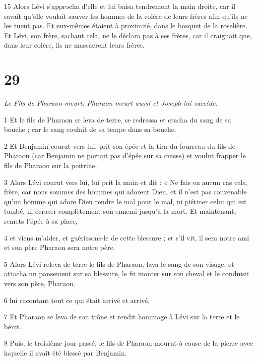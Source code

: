 \par 15 Alors Lévi s'approcha d'elle et lui baisa tendrement la main droite, car il savait qu'elle voulait sauver les hommes de la colère de leurs frères afin qu'ils ne les tuent pas. Et eux-mêmes étaient à proximité, dans le bosquet de la roselière. Et Lévi, son frère, sachant cela, ne le déclara pas à ses frères, car il craignait que, dans leur colère, ils ne massacrent leurs frères.

\chapter{29}

\par \textit{Le Fils de Pharaon meurt. Pharaon meurt aussi et Joseph lui succède.}

\par 1 Et le fils de Pharaon se leva de terre, se redressa et cracha du sang de sa bouche ; car le sang coulait de sa tempe dans sa bouche.

\par 2 Et Benjamin courut vers lui, prit son épée et la tira du fourreau du fils de Pharaon (car Benjamin ne portait pas d'épée sur sa cuisse) et voulut frapper le fils de Pharaon sur la poitrine.

\par 3 Alors Lévi courut vers lui, lui prit la main et dit : « Ne fais en aucun cas cela, frère, car nous sommes des hommes qui adorent Dieu, et il n'est pas convenable qu'un homme qui adore Dieu rendre le mal pour le mal, ni piétiner celui qui est tombé, ni écraser complètement son ennemi jusqu'à la mort. Et maintenant, remets l'épée à sa place,

\par 4 et viens m'aider, et guérissons-le de cette blessure ; et s'il vit, il sera notre ami et son père Pharaon sera notre père.

\par 5 Alors Lévi releva de terre le fils de Pharaon, lava le sang de son visage, et attacha un pansement sur sa blessure, le fit monter sur son cheval et le conduisit vers son père, Pharaon.

\par 6 lui racontant tout ce qui était arrivé et arrivé.

\par 7 Et Pharaon se leva de son trône et rendit hommage à Lévi sur la terre et le bénit.

\par 8 Puis, le troisième jour passé, le fils de Pharaon mourut à cause de la pierre avec laquelle il avait été blessé par Benjamin.

